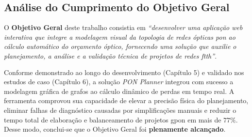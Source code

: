 \subsection{Análise do Cumprimento do Objetivo Geral}

O \textbf{Objetivo Geral} deste trabalho consistia em \textit{``desenvolver uma aplicação web interativa que integre a modelagem visual da topologia de redes ópticas \gls{pon} ao cálculo automático do orçamento óptico, fornecendo uma solução que auxilie o planejamento, a análise e a validação técnica de projetos de redes \gls{ftth}''}.

Conforme demonstrado ao longo do desenvolvimento (Capítulo 5) e validado nos estudos de caso (Capítulo 6), a solução \textit{PON Planner} integrou com sucesso a modelagem gráfica de grafos ao cálculo dinâmico de perdas em tempo real. A ferramenta comprovou sua capacidade de elevar a precisão física do planejamento, eliminar falhas de diagnóstico causadas por simplificações manuais e reduzir o tempo total de elaboração e balanceamento de projetos \gls{gpon} em mais de $77\%$. Desse modo, conclui-se que o Objetivo Geral foi \textbf{plenamente alcançado}.